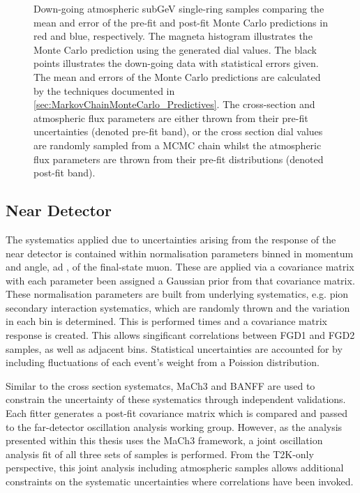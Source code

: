 \begin{figure}[h]
\begin{subfigure}[t]{0.49\textwidth}
  \end{subfigure}
  \caption{Down-going atmospheric subGeV single-ring samples comparing the mean and error of the pre-fit and post-fit Monte Carlo predictions in red and blue, respectively. The magneta histogram illustrates the Monte Carlo prediction using the generated dial values. The black points illustrates the down-going data with statistical errors given. The mean and errors of the Monte Carlo predictions are calculated by the techniques documented in \autoref{sec:MarkovChainMonteCarlo_Predictives}. The cross-section and atmospheric flux parameters are either thrown from their pre-fit uncertainties (denoted pre-fit band), or the cross section dial values are randomly sampled from a MCMC chain whilst the atmospheric flux parameters are thrown from their pre-fit distributions (denoted post-fit band).}
  \label{fig:SelsAndSysts_DownGoingPredictives}
\end{figure}

\subsection{Near Detector}
\label{sec:SelsAndSysts_Systs_ND}

The systematics applied due to uncertainties arising from the response of the near detector is contained within  normalisation parameters binned in momentum and angle,  ad \quickmath{\cos(\theta_{\mu})}, of the final-state muon. These are applied via a covariance matrix with each parameter been assigned a Gaussian prior from that covariance matrix. These normalisation parameters are built from underlying systematics, e.g. pion secondary interaction systematics, which are randomly thrown and the variation in each  bin is determined. This is performed  times and a covariance matrix response is created. This allows singificant correlations between FGD1 and FGD2 samples, as well as adjacent bins. Statistical uncertainties are accounted for by including fluctuations of each event's weight from a Poission distribution.

Similar to the cross section systematcs, MaCh3 and BANFF are used to constrain the uncertainty of these systematics through independent validations. Each fitter generates a post-fit covariance matrix which is compared and passed to the far-detector oscillation analysis working group. However, as the analysis presented within this thesis uses the MaCh3 framework, a joint oscillation analysis fit of all three sets of samples is performed. From the T2K-only perspective, this joint analysis including atmospheric samples allows additional constraints on the systematic uncertainties where correlations have been invoked. 

